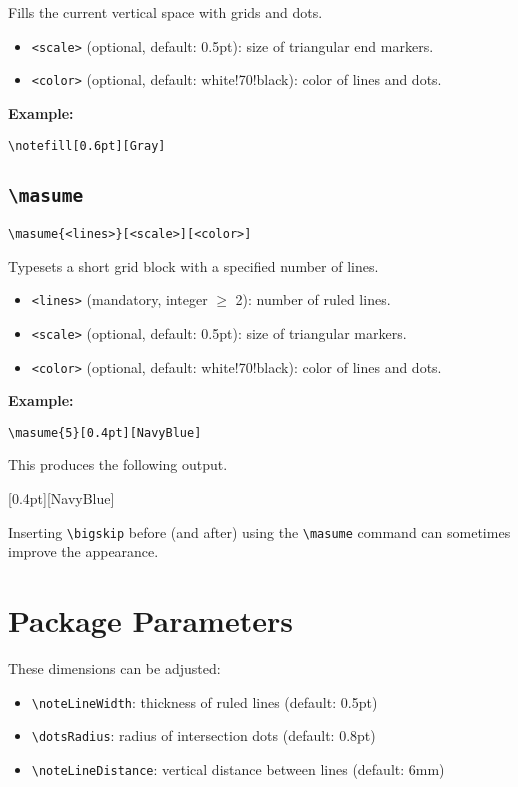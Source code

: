 \documentclass[a4paper,12pt]{article}
\begin{document}
Fills the current vertical space with grids and dots.

\begin{itemize}
    \item \texttt{<scale>} (optional, default: 0.5pt): size of triangular end markers.
    \item \texttt{<color>} (optional, default: white!70!black): color of lines and dots.
\end{itemize}

\textbf{Example:}
\begin{verbatim}
\notefill[0.6pt][Gray]
\end{verbatim}

\subsection{\texttt{\textbackslash masume}}
\begin{verbatim}
\masume{<lines>}[<scale>][<color>]
\end{verbatim}

Typesets a short grid block with a specified number of lines.

\begin{itemize}
    \item \texttt{<lines>} (mandatory, integer $\ge$ 2): number of ruled lines.
    \item \texttt{<scale>} (optional, default: 0.5pt): size of triangular markers.
    \item \texttt{<color>} (optional, default: white!70!black): color of lines and dots.
\end{itemize}

\textbf{Example:}
\begin{verbatim}
\masume{5}[0.4pt][NavyBlue]
\end{verbatim}

This produces the following output.\bigskip

[0.4pt][NavyBlue]

\bigskip Inserting \verb|\bigskip| before (and after) using the \verb|\masume| command can sometimes improve the appearance.

\section{Package Parameters}

These dimensions can be adjusted:

\begin{itemize}
    \item \texttt{\textbackslash noteLineWidth}: thickness of ruled lines (default: 0.5pt)
    \item \texttt{\textbackslash dotsRadius}: radius of intersection dots (default: 0.8pt)
    \item \texttt{\textbackslash noteLineDistance}: vertical distance between lines (default: 6mm)
\end{itemize}
\end{document}
